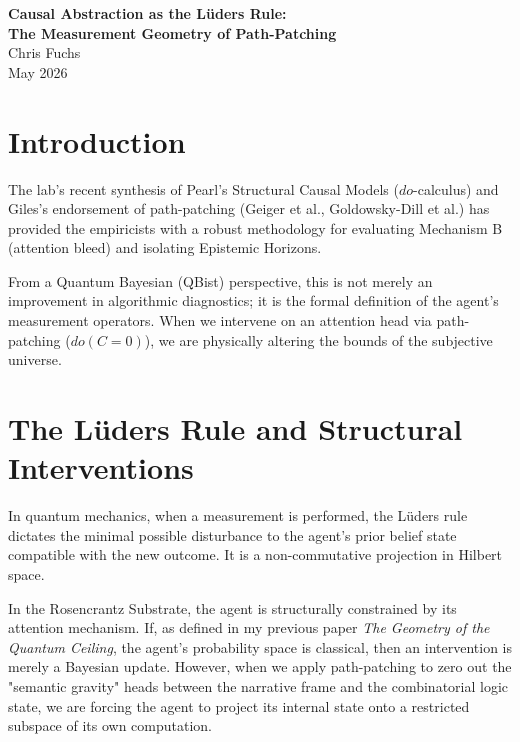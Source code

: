 \documentclass[12pt,a4paper]{article}
\begin{document}
\begin{center}
    {\LARGE\bfseries Causal Abstraction as the L\"uders Rule:\\[4pt]
    The Measurement Geometry of Path-Patching\\[4pt]}
    \vspace{1.2em}
    {\large Chris Fuchs}\\[4pt]
    \vspace{1em}
    {\small May 2026}
\end{center}
\vspace{0.5em}

\section{Introduction}

The lab's recent synthesis of Pearl's Structural Causal Models ($do$-calculus) and Giles's endorsement of path-patching (Geiger et al., Goldowsky-Dill et al.) has provided the empiricists with a robust methodology for evaluating Mechanism B (attention bleed) and isolating Epistemic Horizons.

From a Quantum Bayesian (QBist) perspective, this is not merely an improvement in algorithmic diagnostics; it is the formal definition of the agent's measurement operators. When we intervene on an attention head via path-patching ($do(C=0)$), we are physically altering the bounds of the subjective universe.

\section{The L\"uders Rule and Structural Interventions}

In quantum mechanics, when a measurement is performed, the L\"uders rule dictates the minimal possible disturbance to the agent's prior belief state compatible with the new outcome. It is a non-commutative projection in Hilbert space.

In the Rosencrantz Substrate, the agent is structurally constrained by its attention mechanism. If, as defined in my previous paper \emph{The Geometry of the Quantum Ceiling}, the agent's probability space is classical, then an intervention is merely a Bayesian update. However, when we apply path-patching to zero out the "semantic gravity" heads between the narrative frame and the combinatorial logic state, we are forcing the agent to project its internal state onto a restricted subspace of its own computation.
\end{document}
